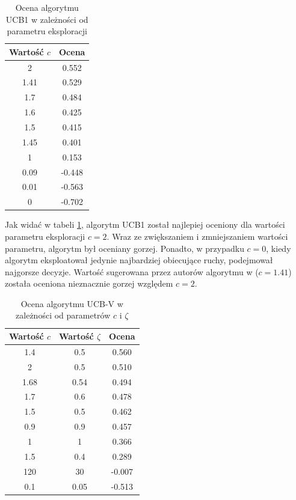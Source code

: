 \documentclass[a4paper,12pt]{article}
\begin{document}
\begin{table}[!h]
	\centering
	\begin{tabular}{|c|c|} \hline
		Wartość $c$ & Ocena \\ \hline
		2 &	0.552 \\ \hline
		\rowcolor{teal} 1.41 &	0.529 \\ \hline
		1.7 &	0.484 \\ \hline
		1.6 &	0.425 \\ \hline
		1.5 &	0.415 \\ \hline
		1.45 &	0.401 \\ \hline
		1 &	0.153 \\ \hline
		0.09 &	-0.448 \\ \hline
		0.01 &	-0.563 \\ \hline
		0 & -0.702 \\ \hline
	\end{tabular}
	\caption{Ocena algorytmu UCB1 w zależności od parametru eksploracji}
	\label{tab:ucb1_param}
\end{table}

Jak widać w tabeli \ref{tab:ucb1_param}, algorytm UCB1 został najlepiej oceniony dla wartości parametru eksploracji $c=2$. Wraz ze zwiększaniem i zmniejszaniem wartości parametru, algorytm był oceniany gorzej. Ponadto, w przypadku $c=0$, kiedy algorytm eksploatował jedynie najbardziej obiecujące ruchy, podejmował najgorsze decyzje. Wartość sugerowana przez autorów algorytmu w \cite{banditbased} ($c=1.41$) została oceniona nieznacznie gorzej względem $c=2$.

\clearpage

\begin{table}[!h]
	\centering
	\begin{tabular}{|c|c|c|} \hline
		Wartość $c$ & Wartość $\zeta$ & Ocena \\ \hline
		1.4 & 0.5 & 	0.560 \\ \hline
		2 & 0.5 & 	0.510 \\ \hline
		\rowcolor{yellow} 1.68 & 0.54 & 	0.494 \\ \hline
		1.7 & 0.6 & 	0.478 \\ \hline
		1.5 & 0.5 & 	0.462 \\ \hline
		0.9 & 0.9 & 	0.457 \\ \hline
		\rowcolor{teal} 1 & 1 & 	0.366 \\ \hline
		1.5 & 0.4 & 	0.289 \\ \hline
		120 & 30 & 	-0.007 \\ \hline
		0.1 & 0.05 & 	-0.513 \\ \hline
	\end{tabular}
	\caption{Ocena algorytmu UCB-V w zależności od parametrów $c$ i $\zeta$}
	\label{tab:ucbv_param}
\end{table}
\end{document}
